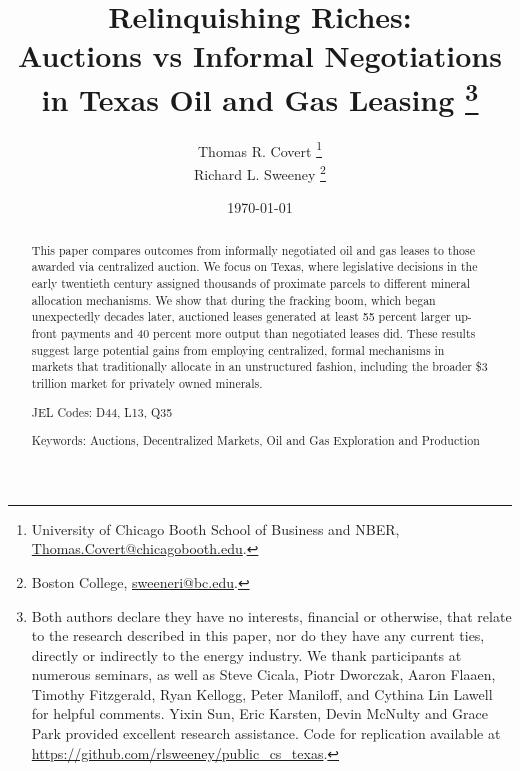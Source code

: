 \documentclass[12pt]{article}
\begin{document}
\title{Relinquishing Riches: \\ Auctions vs Informal Negotiations \\ in Texas Oil and Gas Leasing
\thanks{Both authors declare they have no interests, financial or otherwise, that relate to the research described in this paper, nor do they have any current ties, directly or indirectly to the energy industry. We thank participants at numerous seminars, as well as Steve Cicala, Piotr Dworczak, Aaron Flaaen, Timothy Fitzgerald, Ryan Kellogg, Peter Maniloff, and Cythina Lin Lawell for helpful comments.  Yixin Sun, Eric Karsten, Devin McNulty and Grace Park provided excellent research assistance. Code for replication available at \href{https://github.com/rlsweeney/public_cs_texas}{https://github.com/rlsweeney/public\_cs\_texas}.}
\vspace{10pt}}

\author{Thomas R. Covert \thanks{University of Chicago Booth School of Business and NBER, \protect\href{mailto:Thomas.Covert@chicagobooth.edu}{Thomas.Covert@chicagobooth.edu}.}
\\
 Richard L. Sweeney \thanks{Boston College, \protect\href{mailto:sweeneri@bc.edu}{sweeneri@bc.edu}.}}

\date{\today \\
 \vspace{0.5cm}
}
\maketitle
\begin{abstract}

This paper compares outcomes from informally negotiated oil and gas leases to those awarded via centralized auction. We focus on Texas, where legislative decisions in the early twentieth century assigned thousands of proximate parcels to different mineral allocation mechanisms. We show that during the fracking boom, which began unexpectedly decades later, auctioned leases generated at least 55 percent larger up-front payments and 40 percent more output than negotiated leases did.  These results suggest large potential gains from employing centralized, formal mechanisms in markets that traditionally allocate in an unstructured fashion, including the broader \$3 trillion market for privately owned minerals.

\bigskip{}

\noindent
JEL Codes: D44, L13, Q35

\medskip

\noindent
Keywords: Auctions, Decentralized Markets, Oil and Gas Exploration and Production

\bigskip{}
\end{abstract}
\setcounter{page}{1} \onehalfspace
\end{document}
